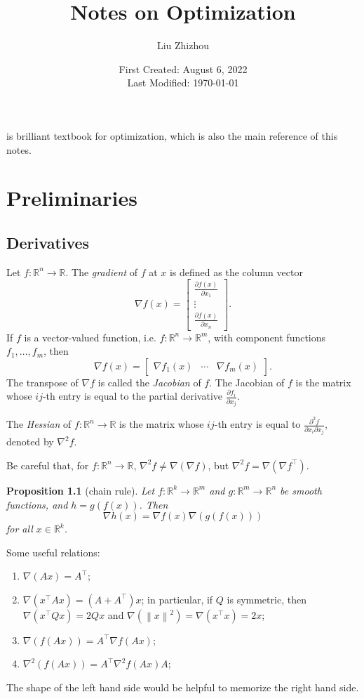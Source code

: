\documentclass[12pt,a4paper]{report}
\title{Notes on Optimization}
\author{Liu Zhizhou}
\date{First Created: August 6, 2022\\
	Last Modified: \today}
\numberwithin{equation}{section}
\theoremstyle{mystyle}
\newtheorem{proposition}[definition]{Proposition}
\newcommand{\R}{\mathbb{R}}
\newcommand{\grad}{\nabla}
\newcommand{\T}{\top}
\newcommand{\norm}[1]{\left\lVert #1 \right\rVert}
\begin{document}
	{\sffamily \maketitle}
	
	\cite{Bertsekas/99} is brilliant textbook for optimization, which is also the main reference of this notes.
	
	\tableofcontents
	\chapter{Preliminaries}
	\section{Derivatives}
	Let $f:\R^n \to \R$. The \emph{gradient} of $f$ at $x$ is defined as the column vector
	$$
	\grad f(x)=
	\begin{bmatrix}
		\frac{\partial f(x)}{\partial x_1}\\
		\vdots\\
		\frac{\partial f(x)}{\partial x_n}
	\end{bmatrix}.
	$$
	If $f$ is a vector-valued function, i.e. $f:\R^n\to \R^m$, with component functions $f_1,\dots,f_m$, then
	$$
	\grad f(x)=
	\begin{bmatrix}
		\grad f_1(x) & \cdots & \grad f_m(x)
	\end{bmatrix}.
	$$
	The transpose of $\grad f$ is called the \emph{Jacobian} of $f$. The Jacobian of $f$ is the matrix whose $ij$-th entry is equal to the partial derivative $\frac{\partial f_i}{\partial x_j}$.
	
	The \emph{Hessian} of $f:\R^n\to \R$ is the matrix whose $ij$-th entry is equal to $\frac{\partial^2 f}{\partial x_i \partial x_j}$, denoted by $\grad^2 f$.
	
	Be careful that, for $f:\R^n \to \R$, $\grad^2 f\neq \grad(\grad f)$, but $\grad^2 f = \grad(\grad f^\T)$.
	\begin{proposition}[chain rule]
		Let $f:\R^k\to \R^m$ and $g:\R^m\to\R^n$ be smooth functions, and $h=g(f(x))$. Then
		$$
		\grad h(x) = \grad f(x)\grad(g(f(x)))
		$$
		for all $x\in \R^k$.
	\end{proposition}
	Some useful relations:
	\begin{enumerate}
		\item $\grad (Ax)=A^\T$;
		\item $\grad (x^\T A x)=(A+A^\T)x$; in particular, if $Q$ is symmetric, then $\grad(x^\T Q x)=2Qx$ and $\grad(\norm{x}^2)=\grad(x^\T x)=2x$;
		\item $\grad(f(Ax))=A^\T \grad f(Ax)$;
		\item $\grad^2(f(Ax))=A^\T \grad^2 f(Ax)A$;
	\end{enumerate}
	The shape of the left hand side would be helpful to memorize the right hand side.
	
\end{document}
